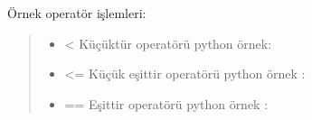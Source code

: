 \documentclass[letterpaper,10pt,turkish]{sphinxmanual}
\begin{document}
Örnek operatör işlemleri:
\begin{quote}
\begin{itemize}
\item {} 
\textless{} Küçüktür operatörü python örnek:

\end{itemize}

\begin{sphinxVerbatim}[commandchars=\\\{\}]
  
  
  
\end{sphinxVerbatim}

\begin{sphinxVerbatim}[commandchars=\\\{\}]
  
  
  
\end{sphinxVerbatim}
\begin{itemize}
\item {} 
\textless{}= Küçük eşittir operatörü python örnek :

\end{itemize}

\begin{sphinxVerbatim}[commandchars=\\\{\}]
  
  
  
\end{sphinxVerbatim}

\begin{sphinxVerbatim}[commandchars=\\\{\}]
  
  
  
\end{sphinxVerbatim}
\begin{itemize}
\item {} 
== Eşittir operatörü python örnek :

\end{itemize}

\begin{sphinxVerbatim}[commandchars=\\\{\}]
  
  
  
\end{sphinxVerbatim}


\end{quote}
\end{document}
